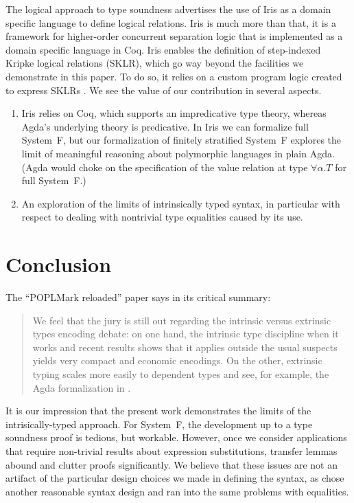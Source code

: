 \documentclass[acmsmall,anonymous,review,screen]{acmart}
\begin{document}
The logical approach to type soundness
\cite{timany24:_logic_approac_type_sound} advertises the use of Iris
as a domain specific language to define logical relations. Iris
\cite{DBLP:journals/jfp/JungKJBBD18} is much more than that, it is a
framework for higher-order concurrent separation logic that is
implemented as a domain specific language in Coq.
Iris enables the definition of step-indexed Kripke logical relations (SKLR),
which go way beyond the facilities we demonstrate in this paper.
To do so, it relies on a custom program logic created to express SKLRs
\cite{DBLP:journals/corr/abs-1103-0510}. 
We see the value of our contribution in several aspects.
\begin{enumerate}
\item Iris relies on Coq, which supports an impredicative type
  theory, whereas Agda's underlying theory is predicative. In Iris we
  can formalize full System~F, but our
  formalization of finitely stratified System~F explores the limit of
  meaningful reasoning about polymorphic languages in plain Agda.
  (Agda would choke on the specification of the value relation at type
  $\forall\alpha.T$ for full System~F.)
\item An exploration of the limits of intrinsically typed syntax, in
  particular with respect to dealing with nontrivial type equalities
  caused by its use.
\end{enumerate}

\section{Conclusion}
\label{sec:conclusion}
\label{sec:future-work}

The ``POPLMark reloaded'' paper \cite[Section 5.1]{DBLP:journals/jfp/AbelAHPMSS19}
says in its critical summary:
\begin{quotation}
  We feel that the jury is still out regarding the intrinsic versus
  extrinsic types encoding debate: on one hand, the intrinsic type
  discipline when it works \textemdash{} and recent results
  \cite{DBLP:journals/pacmpl/PoulsenRTKV18} shows that it applies
  outside the usual suspects \textemdash{} yields very compact and economic
  encodings. On the other, extrinsic typing scales more easily to
  dependent types
  \cite{DBLP:conf/types/Danielsson06,DBLP:journals/entcs/Chapman09,DBLP:conf/popl/AltenkirchK16}
  and see, for example, the Agda formalization in \citet{DBLP:journals/pacmpl/0001OV18}. 
\end{quotation}
It is our impression that the present work demonstrates the limits of
the intrisically-typed approach. For System~F, the development up to a
type soundness proof is tedious, but workable. However, once we
consider applications that require non-trivial results about
expression substitutions, transfer lemmas abound and clutter proofs
significantly. We believe that these issues are not an artifact of the
particular design choices we made in defining the syntax, as
\citet{DBLP:journals/jar/BentonHKM12} chose another reasonable syntax
design and ran into the same problems with equalities.
\end{document}

